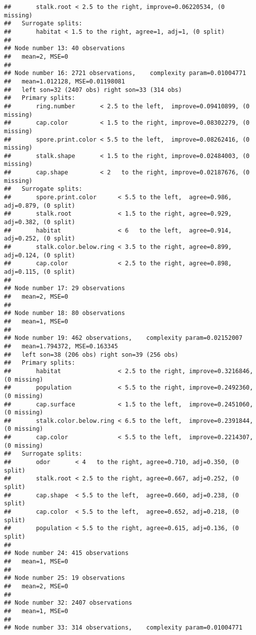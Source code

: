 \documentclass[
]{article}
\begin{document}
\begin{verbatim}
##       stalk.root < 2.5 to the right, improve=0.06220534, (0 missing)
##   Surrogate splits:
##       habitat < 1.5 to the right, agree=1, adj=1, (0 split)
## 
## Node number 13: 40 observations
##   mean=2, MSE=0 
## 
## Node number 16: 2721 observations,    complexity param=0.01004771
##   mean=1.012128, MSE=0.01198081 
##   left son=32 (2407 obs) right son=33 (314 obs)
##   Primary splits:
##       ring.number       < 2.5 to the left,  improve=0.09410899, (0 missing)
##       cap.color         < 1.5 to the right, improve=0.08302279, (0 missing)
##       spore.print.color < 5.5 to the left,  improve=0.08262416, (0 missing)
##       stalk.shape       < 1.5 to the right, improve=0.02484003, (0 missing)
##       cap.shape         < 2   to the right, improve=0.02187676, (0 missing)
##   Surrogate splits:
##       spore.print.color      < 5.5 to the left,  agree=0.986, adj=0.879, (0 split)
##       stalk.root             < 1.5 to the right, agree=0.929, adj=0.382, (0 split)
##       habitat                < 6   to the left,  agree=0.914, adj=0.252, (0 split)
##       stalk.color.below.ring < 3.5 to the right, agree=0.899, adj=0.124, (0 split)
##       cap.color              < 2.5 to the right, agree=0.898, adj=0.115, (0 split)
## 
## Node number 17: 29 observations
##   mean=2, MSE=0 
## 
## Node number 18: 80 observations
##   mean=1, MSE=0 
## 
## Node number 19: 462 observations,    complexity param=0.02152007
##   mean=1.794372, MSE=0.163345 
##   left son=38 (206 obs) right son=39 (256 obs)
##   Primary splits:
##       habitat                < 2.5 to the right, improve=0.3216846, (0 missing)
##       population             < 5.5 to the right, improve=0.2492360, (0 missing)
##       cap.surface            < 1.5 to the left,  improve=0.2451060, (0 missing)
##       stalk.color.below.ring < 6.5 to the left,  improve=0.2391844, (0 missing)
##       cap.color              < 5.5 to the left,  improve=0.2214307, (0 missing)
##   Surrogate splits:
##       odor       < 4   to the right, agree=0.710, adj=0.350, (0 split)
##       stalk.root < 2.5 to the right, agree=0.667, adj=0.252, (0 split)
##       cap.shape  < 5.5 to the left,  agree=0.660, adj=0.238, (0 split)
##       cap.color  < 5.5 to the left,  agree=0.652, adj=0.218, (0 split)
##       population < 5.5 to the right, agree=0.615, adj=0.136, (0 split)
## 
## Node number 24: 415 observations
##   mean=1, MSE=0 
## 
## Node number 25: 19 observations
##   mean=2, MSE=0 
## 
## Node number 32: 2407 observations
##   mean=1, MSE=0 
## 
## Node number 33: 314 observations,    complexity param=0.01004771

\end{verbatim}
\end{document}
